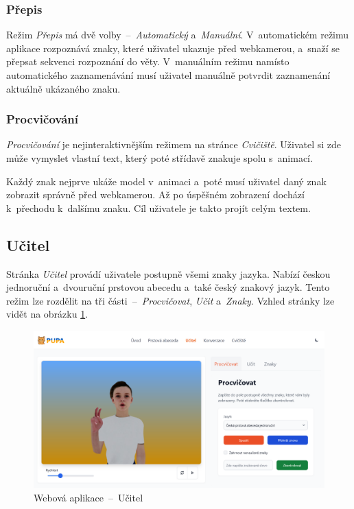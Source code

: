 \documentclass[
  master,
  program=ainfvs,
  biblatex,
  figures=true,
  tables=false,
  sourcecodes=true,
  glossaries,
  index
]{kidiplom}
\begin{document}
        \subsubsection{Přepis}
            Režim \emph{Přepis} má dvě volby~--~\emph{Automatický} a~\emph{Manuální}. V~automatickém režimu aplikace rozpoznává znaky, které uživatel ukazuje před webkamerou, a~snaží se přepsat sekvenci rozpoznání do věty. V~manuálním režimu namísto automatického zaznamenávání musí uživatel manuálně potvrdit zaznamenání aktuálně ukázaného znaku.
        
        \subsubsection{Procvičování}
            \emph{Procvičování} je nejinteraktivnějším režimem na stránce \emph{Cvičiště}. Uživatel si zde může vymyslet vlastní text, který poté střídavě znakuje spolu s~animací. 
            
            Každý znak nejprve ukáže model v~animaci a~poté musí uživatel daný znak zobrazit správně před webkamerou. Až po úspěšném zobrazení dochází k~přechodu k~dalšímu znaku. Cíl uživatele je takto projít celým textem.
        
    \subsection{Učitel}
        Stránka \emph{Učitel} provádí uživatele postupně všemi znaky jazyka. Nabízí českou jednoruční a~dvouruční prstovou abecedu a~také český znakový jazyk. Tento režim lze rozdělit na tři části~--~\emph{Procvičovat}, \emph{Učit} a~\emph{Znaky}. Vzhled stránky lze vidět na obrázku \ref{ucitel}.

         \begin{figure}[htbp]
                \centering
                \includegraphics[width=1\columnwidth]{graphics/ucitel.png}
                \caption{Webová aplikace~--~Učitel}
                \label{ucitel}
            \end{figure}
\end{document}
